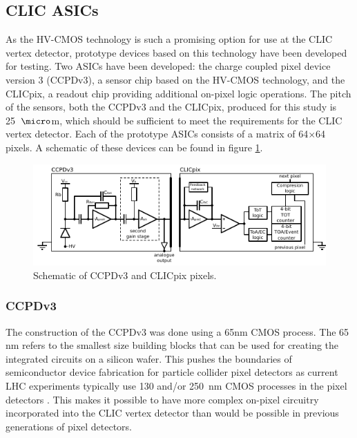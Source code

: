 
\subsection{CLIC ASICs}
As the HV-CMOS technology is such a promising option for use at the CLIC vertex detector, prototype devices based on this technology have been developed for testing.  Two ASICs have been developed: the charge coupled pixel device version 3 (CCPDv3), a sensor chip based on the HV-CMOS technology, and the CLICpix, a readout chip providing additional on-pixel logic operations.  The pitch of the sensors, both the CCPDv3 and the CLICpix, produced for this study is 25~${\micro}$m, which should be sufficient to meet the requirements for the CLIC vertex detector.  Each of the prototype ASICs consists of a matrix of 64$\times$64 pixels.  A schematic of these devices can be found in figure \ref{fig:ccpdandclicpix}.
 
\begin{figure}[h!]
\centering
\includegraphics[width=1.0\textwidth]{CLICdpVertex/Plots/schematic.pdf}
\caption[Schematic of CCPDv3 and CLICpix pixels.]{Schematic of CCPDv3 and CLICpix pixels.}
\label{fig:ccpdandclicpix}
\end{figure}


\subsubsection{CCPDv3}

The construction of the CCPDv3 was done using a 65nm CMOS process.  The 65 nm refers to the smallest size building blocks that can be used for creating the integrated circuits on a silicon wafer.  This pushes the boundaries of semiconductor device fabrication for particle collider pixel detectors as current LHC experiments typically use 130 and/or 250~nm CMOS processes in the pixel detectors \cite{Aaij:2244311, Dominguez:1481838}.  This makes it possible to have more complex on-pixel circuitry incorporated into the CLIC vertex detector than would be possible in previous generations of pixel detectors.  

